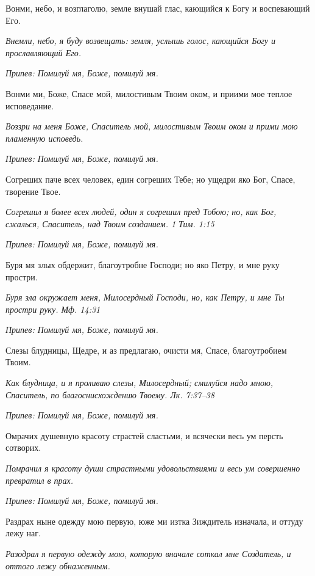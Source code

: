 Вонми, небо, и возглаголю, земле внушай глас, кающийся к Богу и воспевающий Его.


\itshape Внемли, небо, я буду возвещать: земля, услышь голос, кающийся Богу и прославляющий Его.\normalfont{}


\itshape Припев:\normalfont{} Помилуй мя, Боже, помилуй мя.


Вонми ми, Боже, Спасе мой, милостивым Твоим оком, и приими мое теплое исповедание.


\itshape Воззри на меня Боже, Спаситель мой, милостивым Твоим оком и прими мою пламенную исповедь.\normalfont{}


\itshape Припев:\normalfont{} Помилуй мя, Боже, помилуй мя.


Согреших паче всех человек, един согреших Тебе; но ущедри яко Бог, Спасе, творение Твое.


\itshape Согрешил я более всех людей, один я согрешил пред Тобою; но, как Бог, сжалься, Спаситель, над Твоим созданием. 1 Тим. 1:15\normalfont{}


\itshape Припев:\normalfont{} Помилуй мя, Боже, помилуй мя.


Буря мя злых обдержит, благоутробне Господи; но яко Петру, и мне руку простри.


\itshape Буря зла окружает меня, Милосердный Господи, но, как Петру, и мне Ты простри руку. Мф. 14:31\normalfont{}


\itshape Припев:\normalfont{} Помилуй мя, Боже, помилуй мя.


Слезы блудницы, Щедре, и аз предлагаю, очисти мя, Спасе, благоутробием Твоим.


\itshape Как блудница, и я проливаю слезы, Милосердный; смилуйся надо мною, Спаситель, по благоснисхождению Твоему. Лк. 7:37–38\normalfont{}


\itshape Припев:\normalfont{} Помилуй мя, Боже, помилуй мя.


Омрачих душевную красоту страстей сластьми, и всячески весь ум персть сотворих.


\itshape Помрачил я красоту души страстными удовольствиями и весь ум совершенно превратил в прах.\normalfont{}


\itshape Припев:\normalfont{} Помилуй мя, Боже, помилуй мя.


Раздрах ныне одежду мою первую, юже ми изтка Зиждитель изначала, и оттуду лежу наг.


\itshape Разодрал я первую одежду мою, которую вначале соткал мне Создатель, и оттого лежу обнаженным.\normalfont{}


